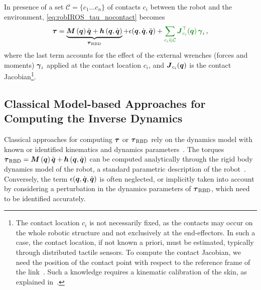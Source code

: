 In presence of a set $\mathcal{C}=\{c_1 \ldots c_n\}$ of contacts $c_i$ between the robot and the environment, \eq\eqref{eq:robIROS_tau_nocontact} becomes
%
\begin{align}
	\torques = \underbrace{\inertiaMatrix\ddq + \Hmatrix}_{\torques_\text{RBD}} + \epsilon(\q,\dq,\ddq) + \color{darkgreen}{\sum_{c_i \in\mathcal{C}} {\jacobian\T_{c_i}(\q)}\, \extForces_i} \,\color{black}{,}
	\label{eq:robIROS_tau_contact}
\end{align}
%
where the last term accounts for the effect of the external wrenches
(forces and moments) $\boldsymbol{\gamma}_i$ applied at the
contact location $c_i$, and $\boldsymbol J_{c_i}(\boldsymbol q)$  is the contact Jacobian\footnote{The contact location $c_i$ is not necessarily fixed, as the contacts may occur on the whole robotic structure and not exclusively at the end-effectors. 
In such a case, the contact location, if not known a priori, must be estimated, typically through distributed tactile sensors.
To compute the contact Jacobian, we need the position of the contact point with respect to the reference frame of the link~\cite{Fumagalli2012}. 
Such a knowledge requires a kinematic calibration of the skin, as explained in~\cite{DelPrete2011}.}.
%



\subsection{Classical Model-based Approaches for Computing the Inverse Dynamics}

	Classical approaches for computing $\boldsymbol{\tau}$ or $\boldsymbol{\tau}_\text{RBD}$ rely on the dynamics model with known or identified kinematics and dynamics parameters~\cite{Ivaldi2011}. 
   	The torques $\boldsymbol{\tau}_\text{RBD} = \boldsymbol M \left( \boldsymbol q \right)\ddot{\boldsymbol q} + \boldsymbol{h} \left(\boldsymbol q,\dot{\boldsymbol q} \right)$ can be computed analytically through the rigid body dynamics model of the robot, a standard parametric description of the robot~\cite{Featherstone2008}. 
   	Conversely, the term $\epsilon(\boldsymbol q,\dot{\boldsymbol q},\ddot{\boldsymbol q})$ is often neglected, or implicitly taken into account by considering a perturbation in the dynamics parameters of $\boldsymbol{\tau}_\text{RBD}$, which need to be identified accurately.






